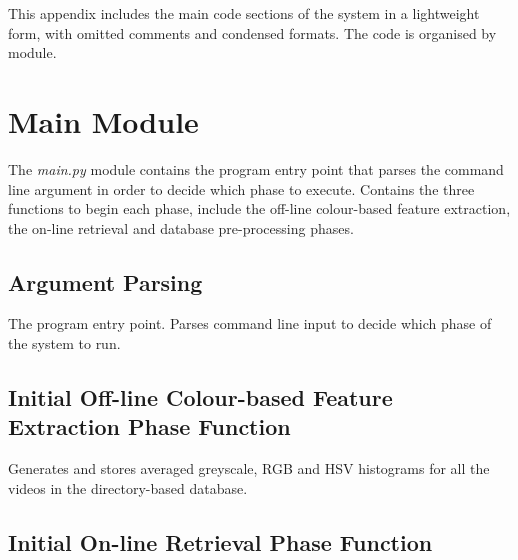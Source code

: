 This appendix includes the main code sections of the system in a lightweight form, with omitted comments and condensed formats. The code is organised by module.


\section{Main Module}

The \textit{main.py} module contains the program entry point that parses the command line argument in order to decide which phase to execute. Contains the three functions to begin each phase, include the off-line colour-based feature extraction, the on-line retrieval and database pre-processing phases.

\subsection{Argument Parsing}
\label{sec:code-listings-argument-parsing}

The program entry point. Parses command line input to decide which phase of the system to run.




\subsection{Initial Off-line Colour-based Feature Extraction Phase Function}
\label{sec:code-off_line_colour_based_feature_extraction_phase}

Generates and stores averaged greyscale, RGB and HSV histograms for all the videos in the directory-based database.




\subsection{Initial On-line Retrieval Phase Function}
\label{sec:code-on_line_retrieval_phase}

